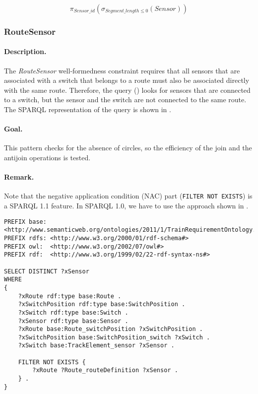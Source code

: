 $$ \pi_{\mathit{Sensor\_id}} \left( \sigma_{\mathit{Segment\_length} \leq 0} \left( \mathit{Sensor} \right) \right) $$

\subsubsection{RouteSensor}

\paragraph{Description.} The \textit{RouteSensor} well-formedness constraint requires that all sensors that are associated with a switch that belongs to a route must also be associated directly with the same route. Therefore, the query () looks for sensors that are connected to a switch, but the sensor and the switch are not connected to the same route. The SPARQL representation of the query is shown in .

\paragraph{Goal.} This pattern checks for the absence of circles, so the efficiency of the join and the antijoin operations is tested.

\paragraph{Remark.} Note that the negative application condition (NAC) part (\texttt{FILTER NOT EXISTS}) is a SPARQL 1.1 feature. In SPARQL 1.0, we have to use the approach shown in .

\begin{lstlisting}[caption=The RouteSensor query in SPARQL, label=lst:routesensor-sparql]
PREFIX base: <http://www.semanticweb.org/ontologies/2011/1/TrainRequirementOntology.owl#>
PREFIX rdfs: <http://www.w3.org/2000/01/rdf-schema#>
PREFIX owl:  <http://www.w3.org/2002/07/owl#>
PREFIX rdf:  <http://www.w3.org/1999/02/22-rdf-syntax-ns#>

SELECT DISTINCT ?xSensor
WHERE
{
    ?xRoute rdf:type base:Route .
    ?xSwitchPosition rdf:type base:SwitchPosition .
    ?xSwitch rdf:type base:Switch .
    ?xSensor rdf:type base:Sensor .
    ?xRoute base:Route_switchPosition ?xSwitchPosition .
    ?xSwitchPosition base:SwitchPosition_switch ?xSwitch .
    ?xSwitch base:TrackElement_sensor ?xSensor .

    FILTER NOT EXISTS {
        ?xRoute ?Route_routeDefinition ?xSensor .
    } .
}
\end{lstlisting}

